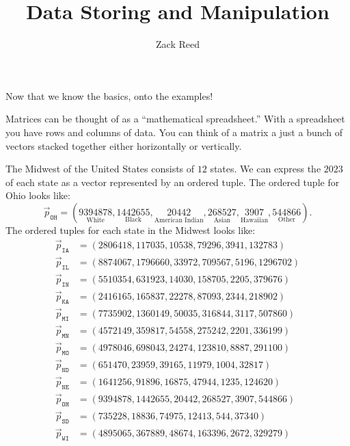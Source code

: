 \documentclass{ximera}
\author{Zack Reed} %
\title{Data Storing and Manipulation}
\begin{document}
\begin{abstract}

\end{abstract}
\maketitle

\begin{exploration}

Now that we know the basics, onto the examples!

Matrices can be thought of as a ``mathematical spreadsheet.'' With a
spreadsheet you have rows and columns of data.  You can think of a
matrix a just a bunch of vectors stacked together either horizontally
or vertically.

 
\begin{example} %
  The Midwest of the United States consists of $12$ states. We can
  express the $2023$
  of each state as a vector represented by an ordered tuple. The
  ordered tuple for Ohio looks like:
  \[
  \vec{p}_{\texttt{OH}} = (\underset{\text{White}}{9394878},\underset{\text{Black}}{1442655},\underset{\text{American Indian}}{20442},\underset{\text{Asian}}{268527},\underset{\text{Hawaiian}}{3907},\underset{\text{Other}}{544866}).
  \]
  The ordered tuples for each state in the Midwest looks like:
\begin{align*}
  \vec{p}_{\texttt{IA}} &= (2806418,117035,10538,79296,3941,132783)\\
  \vec{p}_{\texttt{IL}} &= (8874067,1796660,33972,709567,5196,1296702)\\
  \vec{p}_{\texttt{IN}} &= (5510354,631923,14030,158705,2205,379676)\\
  \vec{p}_{\texttt{KA}} &= (2416165,165837,22278,87093,2344,218902)\\
  \vec{p}_{\texttt{MI}} &= (7735902,1360149,50035,316844,3117,507860)\\
  \vec{p}_{\texttt{MN}} &= (4572149,359817,54558,275242,2201,336199)\\
  \vec{p}_{\texttt{MO}} &= (4978046,698043,24274,123810,8887,291100)\\
  \vec{p}_{\texttt{ND}} &= (651470,23959,39165,11979,1004,32817)\\
  \vec{p}_{\texttt{NE}} &= (1641256,91896,16875,47944,1235,124620)\\
  \vec{p}_{\texttt{OH}} &= (9394878,1442655,20442,268527,3907,544866)\\
  \vec{p}_{\texttt{SD}} &= (735228,18836,74975,12413,544,37340)\\
  \vec{p}_{\texttt{WI}} &= (4895065,367889,48674,163396,2672,329279)
\end{align*}


\end{example}
\end{exploration}
\end{document}
